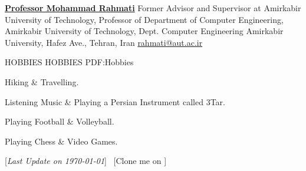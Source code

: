 \documentclass[letterpaper,MMMyyyy,nonstopmode]{resume}
\newcommand{\CVNote}{Last Update on \today}
\begin{document}
\begin{Body}
\BigGap
\BulletItem
\href{https://aut.ac.ir/cv/2416/Mohammad-Rahmati?slc_lang=en&&cv=2416&mod=scv}
{\textbf{Professor Mohammad Rahmati}}
\newline
Former Advisor and Supervisor at Amirkabir University of Technology,
\newline
Professor of Department of Computer Engineering, Amirkabir University of Technology,
\newline
Dept. Computer Engineering Amirkabir University, Hafez Ave., Tehran, Iran
\newline
\href{mailto:rahmatiaut.ac.ir}
{rahmati@aut.ac.ir}


\Section
{HOBBIES}
{HOBBIES}
{PDF:Hobbies}

\BulletItem
Hiking \& Travelling.

\Gap
\BulletItem
Listening Music \& Playing a Persian Instrument called 3Tar.

\Gap
\BulletItem
Playing Football \& Volleyball.

\Gap
\BulletItem
Playing Chess \& Video Games.


{\UseNoteFont
\hfill
[\textit{\CVNote}]
\SubBulletSymbol\,
[Clone me on
\href{https://github.com/aliyazdi75/Resume}
{\faGithub}]}

\end{Body}
\end{document}
